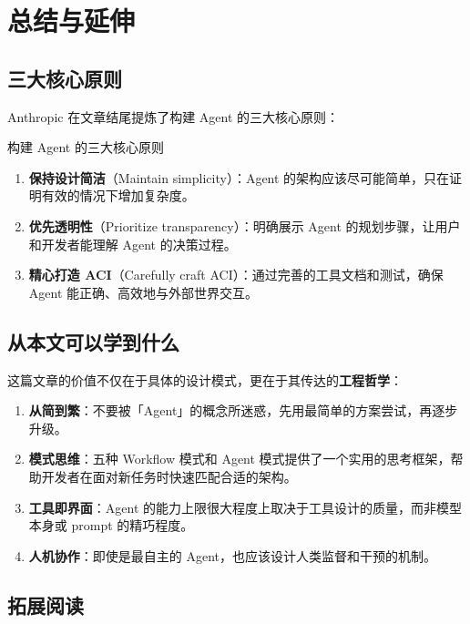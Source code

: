 \section{总结与延伸}

\subsection{三大核心原则}

Anthropic 在文章结尾提炼了构建 Agent 的三大核心原则：

\begin{importantbox}{构建 Agent 的三大核心原则}
\begin{enumerate}
    \item \textbf{保持设计简洁}（Maintain simplicity）：Agent 的架构应该尽可能简单，只在证明有效的情况下增加复杂度。
    \item \textbf{优先透明性}（Prioritize transparency）：明确展示 Agent 的规划步骤，让用户和开发者能理解 Agent 的决策过程。
    \item \textbf{精心打造 ACI}（Carefully craft ACI）：通过完善的工具文档和测试，确保 Agent 能正确、高效地与外部世界交互。
\end{enumerate}
\end{importantbox}

\subsection{从本文可以学到什么}

这篇文章的价值不仅在于具体的设计模式，更在于其传达的\textbf{工程哲学}：

\begin{enumerate}
    \item \textbf{从简到繁}：不要被「Agent」的概念所迷惑，先用最简单的方案尝试，再逐步升级。
    \item \textbf{模式思维}：五种 Workflow 模式和 Agent 模式提供了一个实用的思考框架，帮助开发者在面对新任务时快速匹配合适的架构。
    \item \textbf{工具即界面}：Agent 的能力上限很大程度上取决于工具设计的质量，而非模型本身或 prompt 的精巧程度。
    \item \textbf{人机协作}：即使是最自主的 Agent，也应该设计人类监督和干预的机制。
\end{enumerate}

\subsection{拓展阅读}

